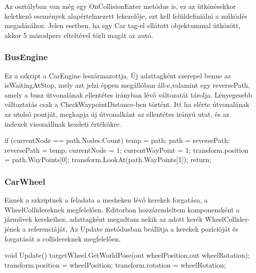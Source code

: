 Az osztályban van még egy OnCollisionEnter metódus is, ez az ütközésekkor keletkező események alapértelmezett lekezelője, ezt kell felüldefiniálni a működés megadásához. Jelen esetben, ha egy Car tag-el ellátott objektummal ütközött, akkor 5 másodperc elteltével törli magát az autó.
\subsubsection{BusEngine}
Ez a szkript a CarEngine leszármazottja. Új adattagként szerepel benne az isWaitingAtStop, mely azt jelzi éppen megállóban áll-e,valamint egy reversePath, amely a busz útvonalának ellentétes irányban lévő változatát tárolja.
Lényegesebb változtatás csak a CheckWaypointDistance-ben történt. Itt ha elérte útvonalának az utolsó pontját, megkapja új útvonalkánt az ellentétes irányú utat, és az indexek visszaállnak kezdeti értékükre.
\begin{cpp}
if (currentNode == path.Nodes.Count)
            {
                temp = path;
                path = reversePath;
                reversePath = temp;
                currentNode = 1;
                currentWayPoint = 1;
                transform.position = path.WayPoints[0];
                transform.LookAt(path.WayPoints[1]);
                return;
            }
\end{cpp}
\subsubsection{CarWheel}
Ennek a szkriptnek a feladata a mesheken lévő kerekek forgatása, a WheelCollidereknek megfelelően. Editorban hozzárendeltem komponensként a járművek kerekeihez, adattagként megadtam nekik az adott kerék WheelCollider-jének a referenciáját.
Az Update metódusban beállítja a kerekek pozícióját és forgatását a collidereknek megfelelően.
\begin{cpp}
    void Update()
    {
        targetWheel.GetWorldPose(out wheelPosition,out wheelRotation);
        transform.position = wheelPosition;
        transform.rotation = wheelRotation;
    }
\end{cpp}
